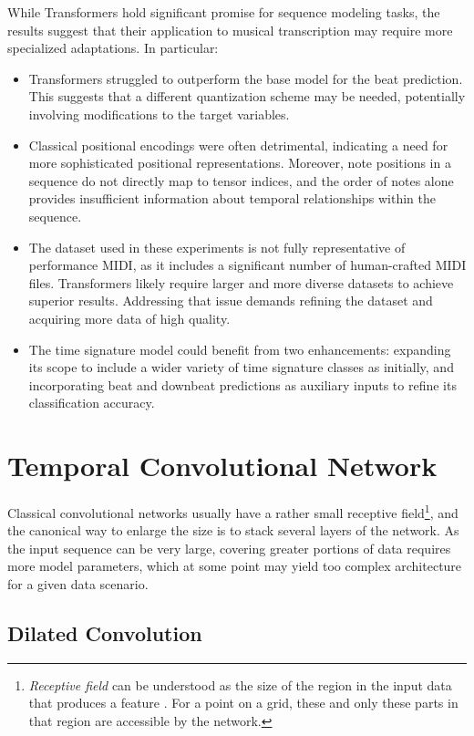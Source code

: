 While Transformers hold significant promise for sequence modeling tasks, the results suggest that their application to musical transcription may require more specialized adaptations. In particular: \begin{itemize}
	\item Transformers struggled to outperform the base model for the beat prediction. This suggests that a different quantization scheme may be needed, potentially involving modifications to the target variables.
	\item Classical positional encodings were often detrimental, indicating a need for more sophisticated positional representations. Moreover, note positions in a sequence do not directly map to tensor indices, and the order of notes alone provides insufficient information about temporal relationships within the sequence.
	\item The dataset used in these experiments is not fully representative of performance MIDI, as it includes a significant number of human-crafted MIDI files. Transformers likely require larger and more diverse datasets to achieve superior results. Addressing that issue demands refining the dataset and acquiring more data of high quality.
	\item The time signature model could benefit from two enhancements: expanding its scope to include a wider variety of time signature classes as initially, and incorporating beat and downbeat predictions as auxiliary inputs to refine its classification accuracy.
\end{itemize}

\section{Temporal Convolutional Network}

Classical convolutional networks usually have a rather small receptive field\footnote{\emph{Receptive field} can be understood as the size of the region in the input data that produces a feature \cite{Araujo2019}. For a point on a grid, these and only these parts in that region are accessible by the network.}, and the canonical way to enlarge the size is to stack several layers of the network. As the input sequence can be very large, covering greater portions of data requires more model parameters, which at some point may yield too complex architecture for a given data scenario.

\subsection{Dilated Convolution}

